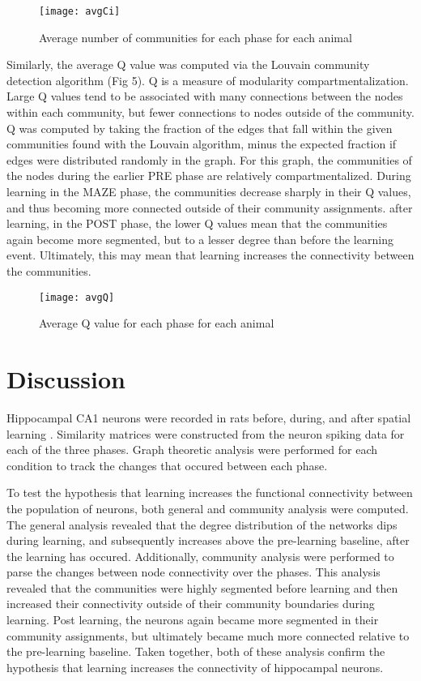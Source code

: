\documentclass[9pt,twocolumn,twoside,lineno]{pnas-new}
\begin{document}
\begin{figure}[tbhp]
\centering
\texttt{[image: avgCi]}
\caption{Average number of communities for each phase for each animal}
\label{fig:avgCi}
\end{figure}

Similarly, the average Q value was computed via the Louvain community detection algorithm (Fig 5). Q is a measure of modularity compartmentalization. Large Q values tend to be associated with many connections between the nodes within each community, but fewer connections to nodes outside of the community. Q was computed by taking the fraction of the edges that fall within the given communities found with the Louvain algorithm, minus the expected fraction if edges were distributed randomly in the graph. For this graph, the communities of the nodes during the earlier PRE phase are relatively compartmentalized. During learning in the MAZE phase, the communities decrease sharply in their Q values, and thus becoming more connected outside of their community assignments. after learning, in the POST phase, the lower Q values mean that the communities again become more segmented, but to a lesser degree than before the learning event. Ultimately, this may mean that learning increases the connectivity between the communities.


\begin{figure}[tbhp]
\centering
\texttt{[image: avgQ]}
\caption{Average Q value for each phase for each animal}
\label{fig:avgQ}
\end{figure}


\section*{Discussion}
Hippocampal CA1 neurons were recorded in rats before, during, and after spatial learning  \cite{grosmark2016diversity}. Similarity matrices were constructed from the neuron spiking data for each of the three phases. Graph theoretic analysis \cite{rubinov2010complex} were performed for each condition to track the changes that occured between each phase.

To test the hypothesis that learning increases the functional connectivity between the population of neurons, both general and community analysis were computed. The general analysis revealed that the degree distribution of the networks dips during learning, and subsequently increases above the pre-learning baseline, after the learning has occured. Additionally, community analysis were performed to parse the changes between node connectivity over the phases. This analysis revealed that the communities were highly segmented before learning and then increased their connectivity outside of their community boundaries during learning. Post learning, the neurons again became more segmented in their community assignments, but ultimately became much more connected relative to the pre-learning baseline. Taken together, both of these analysis confirm the hypothesis that learning increases the connectivity of hippocampal neurons.
\end{document}

